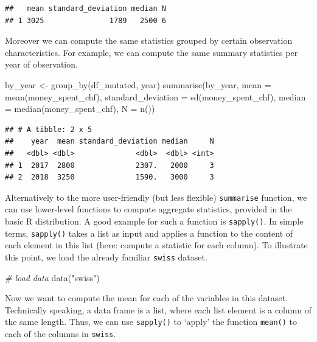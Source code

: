 \documentclass[
  12pt,
]{style/krantz}
\newenvironment{Shaded}{\begin{snugshade}}{\end{snugshade}}
\newcommand{\AttributeTok}[1]{\textcolor[rgb]{0.77,0.63,0.00}{#1}}
\newcommand{\CommentTok}[1]{\textcolor[rgb]{0.56,0.35,0.01}{\textit{#1}}}
\newcommand{\FunctionTok}[1]{\textcolor[rgb]{0.00,0.00,0.00}{#1}}
\newcommand{\NormalTok}[1]{#1}
\newcommand{\OtherTok}[1]{\textcolor[rgb]{0.56,0.35,0.01}{#1}}
\newcommand{\StringTok}[1]{\textcolor[rgb]{0.31,0.60,0.02}{#1}}
\begin{document}
\begin{verbatim}
##   mean standard_deviation median N
## 1 3025               1789   2500 6
\end{verbatim}

Moreover we can compute the same statistics grouped by certain observation characteristics. For example, we can compute the same summary statistics per year of observation.

\begin{Shaded}
\begin{Highlighting}[]
\NormalTok{by\_year }\OtherTok{\textless{}{-}} \FunctionTok{group\_by}\NormalTok{(df\_mutated, year)}
\FunctionTok{summarise}\NormalTok{(by\_year, }
          \AttributeTok{mean =} \FunctionTok{mean}\NormalTok{(money\_spent\_chf),}
          \AttributeTok{standard\_deviation =} \FunctionTok{sd}\NormalTok{(money\_spent\_chf),}
          \AttributeTok{median =} \FunctionTok{median}\NormalTok{(money\_spent\_chf),}
          \AttributeTok{N =} \FunctionTok{n}\NormalTok{())}
\end{Highlighting}
\end{Shaded}

\begin{verbatim}
## # A tibble: 2 x 5
##    year  mean standard_deviation median     N
##   <dbl> <dbl>              <dbl>  <dbl> <int>
## 1  2017  2800              2307.   2000     3
## 2  2018  3250              1590.   3000     3
\end{verbatim}

Alternatively to the more user-friendly (but less flexible) \texttt{summarise} function, we can use lower-level functions to compute aggregate statistics, provided in the basic R distribution. A good example for such a function is \texttt{sapply()}. In simple terms, \texttt{sapply()} takes a list as input and applies a function to the content of each element in this list (here: compute a statistic for each column). To illustrate this point, we load the already familiar \texttt{swiss} dataset.

\begin{Shaded}
\begin{Highlighting}[]
\CommentTok{\# load data}
\FunctionTok{data}\NormalTok{(}\StringTok{"swiss"}\NormalTok{)}
\end{Highlighting}
\end{Shaded}

Now we want to compute the mean for each of the variables in this dataset. Technically speaking, a data frame is a list, where each list element is a column of the same length. Thus, we can use \texttt{sapply()} to `apply' the function \texttt{mean()} to each of the columns in \texttt{swiss}.
\end{document}
